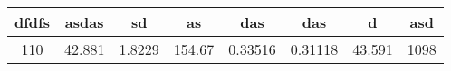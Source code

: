 \begin{center}
\begin{tabular}{|c|c|c|c|c|c|c|c|}
\hline
dfdfs & asdas & sd & as & das & das & d & asd \\
\hline
110 & 42.881 & 1.8229 & 154.67 & 0.33516 & 0.31118 & 43.591 & 1098 \\
\hline
\end{tabular}
\end{center}